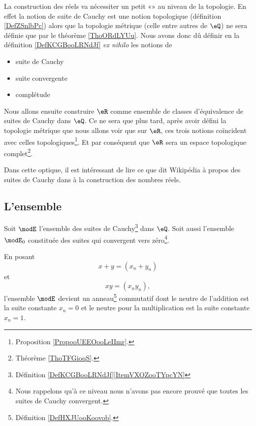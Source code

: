 \begin{normaltext}      \label{NormooHRDZooRGGtCd}
    La construction des réels va nécessiter un petit «» au niveau de la topologie. En effet la notion de suite de Cauchy est une notion topologique (définition \ref{DefZSnlbPc}) alors que la topologie métrique (celle entre autres de \( \eQ\)) ne sera définie que par le théorème \ref{ThoORdLYUu}. Nous avons donc dû définir en la définition \ref{DefKCGBooLRNdJf} \emph{ex nihilo} les notions de
\begin{itemize}
    \item
        suite de Cauchy 
    \item
        suite convergente
    \item
        complétude
\end{itemize}
Nous allons ensuite construire \( \eR\) comme ensemble de classes d'équivalence de suites de Cauchy dans \( \eQ\). Ce ne sera que plus tard, après avoir défini la topologie métrique que nous allons voir que sur \( \eR\), ces trois notions coïncident avec celles topologiques\footnote{Proposition \ref{PropooUEEOooLeIImr}.}. Et par conséquent que \( \eR\) sera un espace topologique complet\footnote{Théorème \ref{ThoTFGioqS}.}.

Dans cette optique, il est intéressant de lire ce que dit Wikipédia à propos des suites de Cauchy dans  à la construction des nombres réels.
\end{normaltext}

\subsection{L'ensemble}

Soit \( \modE\) l'ensemble des suites de Cauchy\footnote{Définition \ref{DefKCGBooLRNdJf}\ref{ItemVXOZooTYpcYN}} dans \( \eQ\). Soit aussi l'ensemble \( \modE_0\) constituée des suites qui convergent vers zéro\footnote{Nous rappelons qu'à ce niveau nous n'avons pas encore prouvé que toutes les suites de Cauchy convergent.}.

En posant 
\begin{equation}
    x+y=(x_n+y_n)
\end{equation}
et
\begin{equation}
    xy=(x_ny_n),
\end{equation}
l'ensemble \( \modE\) devient un anneau\footnote{Définition \ref{DefHXJUooKoovob}.} commutatif dont le neutre de l'addition est la suite constante \( x_n=0\) et le neutre pour la multiplication est la suite constante \( x_n=1\).

